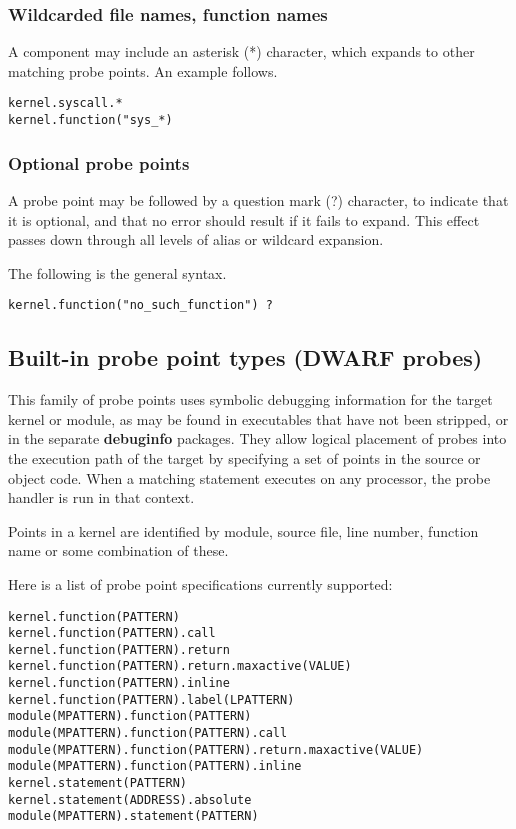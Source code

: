 \documentclass[twoside,english]{article}
\newenvironment{vindent}
{\begin{list}{}{\setlength{\listparindent}{6pt}}
\item[]}
{\end{list}}
\begin{document}
\subsubsection{Wildcarded file names, function names}
A component may include an asterisk ({*}) character, which expands to other
matching probe points. An example follows.

\begin{vindent}
\begin{verbatim}
kernel.syscall.*
kernel.function("sys_*)
\end{verbatim}
\end{vindent}

\subsubsection{Optional probe points\label{sub:Optional-probe-points}}
A probe point may be followed by a question mark (?) character, to indicate
that it is optional, and that no error should result if it fails to expand.
This effect passes down through all levels of alias or wildcard expansion.

The following is the general syntax.

\begin{vindent}
\begin{verbatim}
kernel.function("no_such_function") ?
\end{verbatim}
\end{vindent}

\subsection{Built-in probe point types (DWARF probes)}
This family of probe points uses symbolic debugging information for the target
kernel or module, as may be found in executables that have not
been stripped, or in the separate \textbf{debuginfo} packages. They allow
logical placement of probes into the execution path of the target 
by specifying a set of points in the source or object code. When a matching
statement executes on any processor, the probe handler is run in that context.

Points in a kernel are identified by module, source file, line number, function
name or some combination of these.

Here is a list of probe point specifications currently supported: 

\begin{vindent}
\begin{verbatim}
kernel.function(PATTERN)
kernel.function(PATTERN).call
kernel.function(PATTERN).return
kernel.function(PATTERN).return.maxactive(VALUE)
kernel.function(PATTERN).inline
kernel.function(PATTERN).label(LPATTERN)
module(MPATTERN).function(PATTERN)
module(MPATTERN).function(PATTERN).call
module(MPATTERN).function(PATTERN).return.maxactive(VALUE)
module(MPATTERN).function(PATTERN).inline
kernel.statement(PATTERN)
kernel.statement(ADDRESS).absolute
module(MPATTERN).statement(PATTERN)
\end{verbatim}
\end{vindent}
\end{document}
